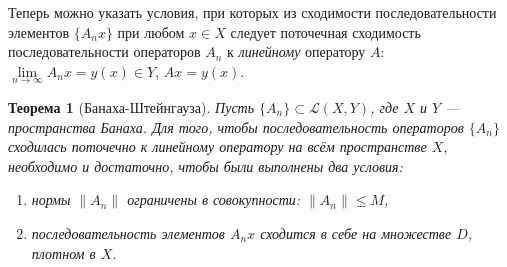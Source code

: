 \documentclass[12pt,a4paper,titlepage,oneside]{book}
\theoremstyle{definition}
\theoremstyle{plain}
\newtheorem*{theorem}{Теорема}
\theoremstyle{break}
\theoremstyle{remark}
\theoremstyle{remark}
\theoremstyle{remark}
\theoremstyle{remark}
\theoremstyle{plain}
\theoremstyle{plain}
\begin{document}
Теперь можно указать условия, при которых из сходимости последовательности элементов $\lbrace A_n x\rbrace$ при любом $x \in X$ следует поточечная сходимость последовательности операторов $A_n$ к \textit{линейному} оператору $A$: $\lim\limits_{n \to \infty}A_n x = y(x) \in Y$, $Ax=y(x)$.

\begin{theorem}[Банаха-Штейнгауза]
Пусть $\lbrace A_n\rbrace \subset \mathcal{L}(X,Y)$, где $X$ и $Y$ --- пространства Банаха. Для того, чтобы последовательность операторов $\lbrace A_n\rbrace$ сходилась поточечно к линейному оператору на всём пространстве $X$, необходимо и достаточно, чтобы были выполнены два условия:

\begin{enumerate}
\item нормы $\lVert A_n\rVert$ ограничены в совокупности: $\lVert A_n\rVert \leqslant M$,
\item последовательность элементов $A_n x$ сходится в себе на множестве $D$, плотном в $X$.
\end{enumerate}
\end{theorem}
\end{document}
